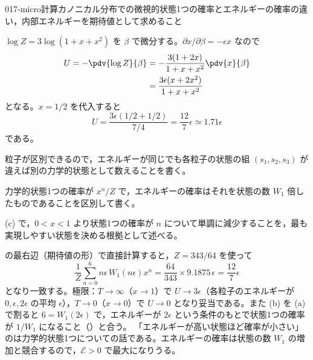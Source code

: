 \documentclass[uplatex,dvipdfmx,a4paper,11pt]{jsarticle}
\begin{document}
\begin{mondai}{017-micro}{計算}{カノニカル分布での微視的状態1つの確率とエネルギーの確率の違い，内部エネルギーを期待値として求めること}
\begin{tadashii}
 $\log Z=3\log(1+x+x^{2})$ を $\beta$ で微分する。$\partial x/\partial\beta=-\epsilon x$ なので
\begin{align*}
U=-\pdv{\log Z}{\beta}&=-\frac{3(1+2x)}{1+x+x^{2}}\pdv{x}{\beta}\\
&=\frac{3\epsilon(x+2x^{2})}{1+x+x^{2}}
\end{align*}
となる。$x=1/2$ を代入すると
\[ U=\frac{3\epsilon(1/2+1/2)}{7/4}=\frac{12}{7}\epsilon\simeq\num{1.71}\epsilon \]
である。
\begin{ronten}
  \item {} 粒子が区別できるので，エネルギーが同じでも各粒子の状態の組 $(s_{1},s_{2},s_{3})$ が違えば別の力学的状態として数えることを書く。
  \item {} 力学的状態1つの確率が $x^{n}/Z$ で，エネルギーの確率はそれを状態の数 $W_{1}$ 倍したものであることを区別して書く。
  \item {} (c) で，$0<x<1$ より状態1つの確率が $n$ について単調に減少することを，最も実現しやすい状態を決める根拠として述べる。
\end{ronten}
\kenzan {} の最右辺（期待値の形）で直接計算すると，$Z=343/64$ を使って
\[ \frac{1}{Z}\sum_{n=0}^{6}n\epsilon\,W_{1}(n\epsilon)x^{n}=\frac{64}{343}\times\num{9.1875}\,\epsilon=\frac{12}{7}\epsilon \]
となり一致する。極限：$T\to\infty$（$x\to1$）で $U\to3\epsilon$（各粒子のエネルギーが $0,\epsilon,2\epsilon$ の平均 $\epsilon$），$T\to0$（$x\to0$）で $U\to0$ となり妥当である。また (b) を (a) で割ると $6=W_{1}(2\epsilon)$ で，エネルギーが $2\epsilon$ という条件のもとで状態1つの確率が $1/W_{1}$ になること（）と合う。
\tsumazuki 「エネルギーが高い状態ほど確率が小さい」のは力学的状態1つについての話である。エネルギーの確率は状態の数 $W_{1}$ の増加と競合するので，$\mathcal{E}>0$ で最大になりうる。
\end{tadashii}
\end{mondai}
\end{document}
